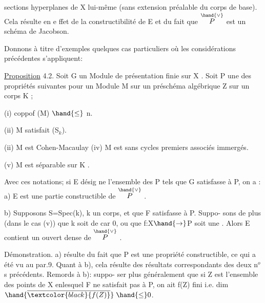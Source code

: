 
sections hyperplanes de X lui-même (sans extension préalable du corps
\placedmargin{$\hand{\rightarrow}$}de base). Cela résulte en e ffet de la constructibilité de E et du fait
que $\overset{\hand{\vee}}{P}$ est un schéma de Jacobson.

Donnons à titre d'exemples quelques cas particuliers où les
considérations précédentes s'appliquent:

\uline{Proposition} 4.2. Soit G un Module de présentation finie sur X .
Soit P une des propriétés suivantes pour un Module M sur un préschéma
algébrique Z sur un corps K ;


(i) coppof (M) $\hand{\leq}$ n.

(ii) M satisfait (S$_{k}$).

(i\unsure{}i) M est Cohen-Macaulay
(iv) M est sans cycles premiers associés immergés.

(v) M est séparable sur  K .



 Avec ces notations; si E désig%
ne l'ensemble des \hand{$\xi\in$} P tels que G\hand{$_{\xi}$} satisfasse à P, on a :
a) E est une partie constructible de $\overset{\hand{\vee}}{P}$ .

b) Supposons S=Spec(k), k un corps, et que F satisfasse à P. Suppo-%
sons de plus (dans le cas (v)) que k soit de car 0, ou que f:X$\hand{\rightarrow}$P soit une . 
Alors E contient un ouvert dense de $\overset{\hand{\vee}}{P}$ .

Démonstration. a) résulte du fait que P est une propriété
constructible, ce qui a été vu au par.9. Quant à b), cela résulte
des résultats correspondants des deux n$^{o}$s précédents. Remords à b): suppo-%
ser plus généralement que si Z est l'ensemble des points de X enlesquel%
F ne satisfait pas à P, on ait f(Z) fini i.e. dim $\hand{\overline{\textcolor{black}{f(Z)}}}\;\hand{\leq}0$.


